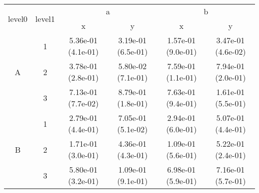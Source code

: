 \begin{tabular}{cccccc}
\toprule
\multirow{2}{*}{level0} & \multirow{2}{*}{level1}&\multicolumn{2}{c}{a}&\multicolumn{2}{c}{b}\tabularnewline
\cmidrule(lr){3-4}
\cmidrule(lr){5-6}
&&x&y&x&y\tabularnewline
\midrule
\multirow{3}{*}{A}&1& 5.36e-01 (4.1e-01)& 3.19e-01 (6.5e-01)& 1.57e-01 (9.0e-01)& 3.47e-01 (4.6e-02)\tabularnewline
&2& 3.78e-01 (2.8e-01)& 5.80e-02 (7.1e-01)& 7.59e-01 (1.1e-01)& 7.94e-01 (2.0e-01)\tabularnewline
&3& 7.13e-01 (7.7e-02)& 8.79e-01 (1.8e-01)& 7.63e-01 (9.4e-01)& 1.61e-01 (5.5e-01)\tabularnewline
\midrule
\multirow{3}{*}{B}&1& 2.79e-01 (4.4e-01)& 7.05e-01 (5.1e-02)& 2.94e-01 (6.0e-01)& 5.07e-01 (4.4e-01)\tabularnewline
&2& 1.71e-01 (3.0e-01)& 4.36e-01 (4.3e-01)& 1.09e-01 (5.6e-01)& 5.22e-01 (2.4e-01)\tabularnewline
&3& 5.80e-01 (3.2e-01)& 1.09e-01 (9.1e-01)& 6.98e-01 (5.9e-01)& 7.16e-01 (5.7e-01)\tabularnewline
\bottomrule
\end{tabular}
